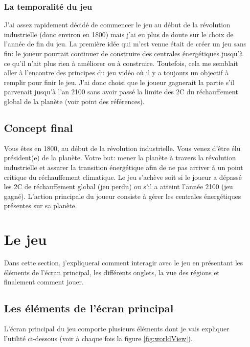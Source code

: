\documentclass{article}
\begin{document}
        \subsubsection{La temporalité du jeu}	
        J'ai assez rapidement décidé de commencer le jeu au début de la révolution industrielle (donc environ en 1800) mais j'ai eu plus de doute sur le choix de l'année de fin du jeu. La première idée qui m'est venue était de créer un jeu sans fin: le joueur pourrait continuer de construire des centrales énergétiques jusqu'à ce qu'il n'ait plus rien à améliorer ou à construire. Toutefois, cela me semblait aller à l'encontre des principes du jeu vidéo où il y a toujours un objectif à remplir pour finir le jeu. J'ai donc choisi que le joueur gagnerait la partie s'il parvenait jusqu'à l'an 2100 sans avoir passé la limite des 2\degree C du réchauffement global de la planète (voir point \cite{objsParis2100} des références).
		
        \subsection{Concept final}
		Vous êtes en 1800, au début de la révolution industrielle. Vous venez d'être élu président(e) de la planète. Votre but: mener la planète à travers la révolution industrielle et assurer la transition énergétique afin de ne pas arriver à un point critique du réchauffement climatique. Le jeu s'achève soit si le joueur a dépassé les 2\degree C de réchauffement global (jeu perdu) ou s'il a atteint l'année 2100 (jeu gagné).
        L'action principale du joueur consiste à gérer les centrales énergétiques présentes sur sa planète.

        \section{Le jeu}
		Dans cette section, j'expliquerai comment interagir avec le jeu en présentant les éléments de l'écran principal, les différents onglets, la vue des régions et finalement comment jouer.        
        
        \subsection{Les éléments de l'écran principal}
		L'écran principal du jeu comporte plusieurs éléments dont je vais expliquer l'utilité ci-dessous (voir à chaque fois la figure \ref{fig:worldView}).
		
\end{document}
